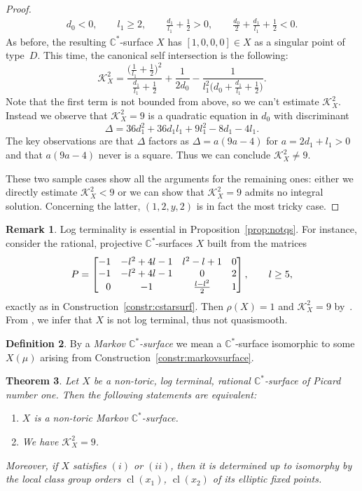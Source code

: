\documentclass[pdftex]{sigma}
\newtheorem{thm}{Theorem}[section]
\theoremstyle{definition}
\newtheorem{defi}[thm]{Definition}
\newtheorem{rem}[thm]{Remark}
\def\CC{{\mathbb C}}
\DeclareMathOperator{\cl}{cl}
\begin{document}
\begin{proof}
\begin{gather*}
d_0 < 0, \qquad l_1 \ge 2, \qquad \frac{d_1}{l_1}+\frac{1}{2} > 0, \qquad \frac{d_0}{2}+\frac{d_1}{l_1}+\frac{1}{2} < 0.
\end{gather*}
As before, the resulting $\CC^*$-surface $X$
has $[1,0,0,0] \in X$ as a singular point
of type~$D$.
This time, the canonical self intersection
is the following:
\[
\mathcal{K}_X^2
 =
\frac{\bigl(\frac{1}{l_1}+\frac{1}{2}\bigr)^2}{\frac{d_1}{l_1}+\frac{1}{2}}
 +
\frac{1}{2d_0}
 -
\frac{1}{l_1^2\bigl(d_0+\frac{d_1}{l_1}+\frac{1}{2}\bigr)}.
\]
Note that the first term is not bounded from above,
so we can't estimate $\mathcal{K}_X^2$.
Instead we observe that $\mathcal{K}_X^2=9$ is a
quadratic equation in $d_0$ with discriminant
\[
\Delta
 =
36d_1^2 + 36d_1l_1 + 9l_1^2 - 8d_1 - 4l_1.
\]
The key observations are that $\Delta$ factors as
$\Delta = a(9a-4)$ for $a=2d_1+l_1>0$ and
that $a(9a-4)$ never is a square.
Thus we can conclude $\mathcal{K}_X^2 \ne 9$.

These two sample cases show all the arguments
for the remaining ones: either we directly
estimate $\mathcal{K}_X^2 < 9$ or we can
show that $\mathcal{K}_X^2 = 9$ admits no
integral solution.
Concerning the latter, $(1,2,y,2)$ is in fact
the most tricky case.
\end{proof}


\begin{rem}
Log terminality is essential in Proposition~\ref{prop:notqs}.
For instance, consider the rational, projective
$\CC^*$-surfaces $X$ built from the matrices
\[
P
 =
\begin{bmatrix}
-1 & -l^2 + 4l - 1 & l^2 - l + 1 & 0
\\
-1 & -l^2 + 4l - 1 & 0 & 2
\\
\hphantom{-} 0 & -1 & \frac{l-l^2}{2} & 1
\end{bmatrix},
\qquad l \ge 5,
\]
exactly as in Construction~\ref{constr:cstarsurf}.
Then $\rho(X)=1$ and $\mathcal{K}_X^2=9$ by~\cite[Proposition~6.9]{HaHaSp}.
From \mbox{\cite[Corollary~8.12]{HaHaSp}}, we infer that $X$ is
not log terminal, thus not quasismooth.
\end{rem}



\begin{defi}
By a \emph{Markov $\CC^*$-surface} we mean
a $\CC^*$-surface isomorphic to some $X(\mu)$
arising from Construction~\ref{constr:markovsurface}.
\end{defi}


\begin{thm}
\label{thm:markovsurfchar}
Let $X$ be a non-toric, log terminal,
rational $\CC^*$-surface of Picard number one.
Then the following statements are equivalent:
\begin{enumerate}\itemsep=0pt
\item[$(i)$]
$X$ is a non-toric Markov $\CC^*$-surface.
\item[$(ii)$]
We have $\mathcal{K}_X^2 = 9$.
\end{enumerate}
Moreover, if $X$ satisfies $(i)$ or $(ii)$, then it is
determined up to isomorphy by the local class group
orders $\cl(x_1)$, $\cl(x_2)$ of its elliptic fixed points.
\end{thm}
\end{document}
